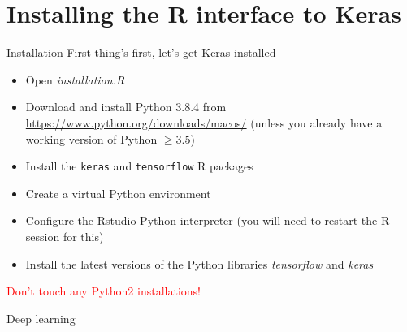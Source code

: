 \documentclass{beamer}
\begin{document}
\section{Installing the R interface to Keras}
\begin{frame}{Installation}
 First thing's first, let's get Keras installed
\begin{itemize}
\item Open \textit{installation.R}
\item Download and install Python 3.8.4 from \url{https://www.python.org/downloads/macos/} (unless you already have a working version of Python $\geq 3.5$)
\item Install the \texttt{keras} and \texttt{tensorflow} R packages
\item Create a virtual Python environment 
\item Configure the Rstudio Python interpreter (you will need to restart the R session for this)
\item Install the latest versions of the Python libraries \textit{tensorflow} and \textit{keras}
\end{itemize}
\textcolor{red}{Don't touch any Python2 installations!}
\end{frame}
\begin{frame}
\begin{center}
\Huge Deep learning
\end{center}
\end{frame}
\end{document}
